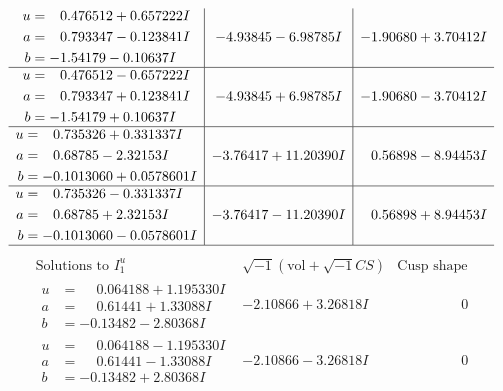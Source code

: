 \documentclass[1p]{elsarticle_modified}
\theoremstyle{definition}
\newcommand{\I}{\sqrt{-1}}
\begin{document}
$$\begin{array}{c|c|c}
\begin{aligned}
u &= \phantom{-}0.476512 + 0.657222 I \\
a &= \phantom{-}0.793347 - 0.123841 I \\
b &= -1.54179 - 0.10637 I\end{aligned}
 & -4.93845 - 6.98785 I & -1.90680 + 3.70412 I \\ \hline\begin{aligned}
u &= \phantom{-}0.476512 - 0.657222 I \\
a &= \phantom{-}0.793347 + 0.123841 I \\
b &= -1.54179 + 0.10637 I\end{aligned}
 & -4.93845 + 6.98785 I & -1.90680 - 3.70412 I \\ \hline\begin{aligned}
u &= \phantom{-}0.735326 + 0.331337 I \\
a &= \phantom{-}0.68785 - 2.32153 I \\
b &= -0.1013060 + 0.0578601 I\end{aligned}
 & -3.76417 + 11.20390 I & \phantom{-}0.56898 - 8.94453 I \\ \hline\begin{aligned}
u &= \phantom{-}0.735326 - 0.331337 I \\
a &= \phantom{-}0.68785 + 2.32153 I \\
b &= -0.1013060 - 0.0578601 I\end{aligned}
 & -3.76417 - 11.20390 I & \phantom{-}0.56898 + 8.94453 I\\
 \hline 
 \end{array}$$\newpage$$\begin{array}{c|c|c}  
\text{Solutions to }I^u_{1}& \I (\text{vol} + \sqrt{-1}CS) & \text{Cusp shape}\\
 \hline 
\begin{aligned}
u &= \phantom{-}0.064188 + 1.195330 I \\
a &= \phantom{-}0.61441 + 1.33088 I \\
b &= -0.13482 - 2.80368 I\end{aligned}
 & -2.10866 + 3.26818 I & \phantom{-0.000000 } 0 \\ \hline\begin{aligned}
u &= \phantom{-}0.064188 - 1.195330 I \\
a &= \phantom{-}0.61441 - 1.33088 I \\
b &= -0.13482 + 2.80368 I\end{aligned}
 & -2.10866 - 3.26818 I & \phantom{-0.000000 } 0 \\ \hline\begin{aligned}

\end{aligned}
\end{array}$$
\end{document}
